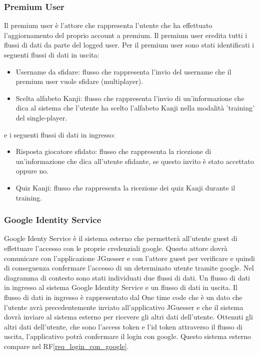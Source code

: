 \subsubsection{Premium User}
Il premium user è l'attore che rappresenta l'utente che ha effettuato l'aggiornamento del proprio account a premium. Il premium user eredita tutti i flussi di dati da parte del logged user. Per il premium user sono stati identificati i seguenti flussi di dati in uscita:
\begin{itemize}
    \item Username da sfidare: flusso che rappresenta l'invio del username che il premium user vuole sfidare (multiplayer).
    \item Scelta alfabeto Kanji: flusso che rappresenta l'invio di un'informazione che dica al sistema che l'utente ha scelto l'alfabeto Kanji nella modalità 'training' del single-player.
\end{itemize}
\noindent
e i seguenti flussi di dati in ingresso:
\begin{itemize}
    \item Risposta giocatore sfidato: flusso che rappresenta la ricezione di un'informazione che dica all'utente sfidante, se questo invito è stato accettato oppure no.
    \item Quiz Kanji: flusso che rappresenta la ricezione dei quiz Kanji durante il training.
\end{itemize}

\subsubsection{Google Identity Service}
Google Identy Service è il sistema esterno che permetterà all'utente guest di effettuare l'accesso con le proprie credenziali google. Questo attore dovrà comunicare con l'applicazione JGuesser e con l'attore guest per verificare e quindi di conseguenza confermare l'accesso di un determinato utente tramite google. Nel diagramma di contesto sono stati individuati due flussi di dati. Un flusso di dati in ingresso al sistema Google Identity Service e un flusso di dati in uscita. Il flusso di dati in ingresso è rappresentato dal One time code che è un dato che l'utente avrà precedentemente inviato all'applicativo JGuesser e che il sistema dovrà inviare al sistema esterno per ricevere gli altri dati dell'utente. Ottenuti gli altri dati dell'utente, che sono l'access token e l'id token attraverso il flusso di uscita, l'applicativo potrà confermare il login con google. Questo sistema esterno compare nel RF\ref{req_login_con_google}.

